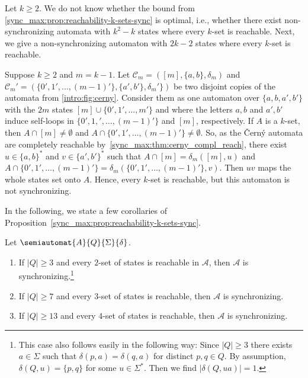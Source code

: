 Let $k \ge 2$. We do not know whether
the bound from \cref{sync_max:prop:reachability-k-sets-sync}
is optimal, i.e., whether there exist non-synchronizing automata
with $k^2 - k$ states where every $k$-set is reachable.
Next, we give a non-synchronizing automaton with $2k - 2$ states
where every $k$-set is reachable.

\begin{example} \label{sync_max:ex:k-reachable-not-sync}
	Suppose $k \ge 2$ and $m = k - 1$. Let 
	$\mathcal C_m = ([m], \{a,b\}, \delta_m)$
	and $\mathcal C_m' = (\{0',1',\ldots,(m-1)'\}, \{a',b'\}, \delta_m'\})$ 
	be two disjoint copies of the \Cerny automata from \cref{intro:fig:cerny}.
	Consider them as one automaton over $\{a,b,a',b'\}$ with 
	the $2m$ states $[m] \cup \{0',1',\ldots,m'\}$
	and where the letters $a,b$ and $a', b'$
	induce self-loops in $\{0',1,',\ldots,(m-1)'\}$ and $[m]$, respectively.
	If $A$ is a $k$-set,
	then $A \cap [m] \ne \emptyset$
	and $A \cap \{0', 1', \ldots, (m-1)'\} \ne \emptyset$.
	So, as the \v{C}ern\'y automata are completely reachable by~\cref{sync_max:thm:cerny_compl_reach},
	there exist $u \in \{a,b\}^*$
	and $v \in \{a', b'\}^*$
	such that $A\cap [m] = \delta_m([m], u)$
	and $A \cap \{0', 1', \ldots, (m-1)'\} = \delta_m(\{0', 1', \ldots, (m-1)'\}, v)$.
	Then $uv$ maps the whole states set onto $A$.
    Hence, every $k$-set is reachable, but this automaton is not synchronizing.	
\end{example}

In the following, we state a few corollaries of Proposition~\ref{sync_max:prop:reachability-k-sets-sync}.

\begin{corollary}\label{sync_max:cor:k-sets-implies-sync}
	Let $\semiautomat{A}{Q}{\Sigma}{\delta}$.
	\begin{enumerate}
		\item \label{sync_max:cor:2-sets-implies-sync} If $|Q| \ge 3$ and every $2$-set of states is reachable in $\mathcal A$, then $\mathcal A$ is synchronizing.\footnote{
		This case also follows easily in the following way: Since $|Q| \ge 3$
		there exists $a \in \Sigma$ such that $\delta(p, a) = \delta(q, a)$
		for distinct $p,q\in Q$.
		By assumption, $\delta(Q, u) = \{p,q\}$ for some $u \in \Sigma^*$.
		Then we find $|\delta(Q, ua)| = 1$.}
		
		\item If $|Q| \ge 7$ and every $3$-set of states is reachable, then $\mathcal A$ is synchronizing.
		
		\item If $|Q| \ge 13$ and every $4$-set of states is reachable, then $\mathcal A$ is synchronizing.
	\end{enumerate}
\end{corollary}


